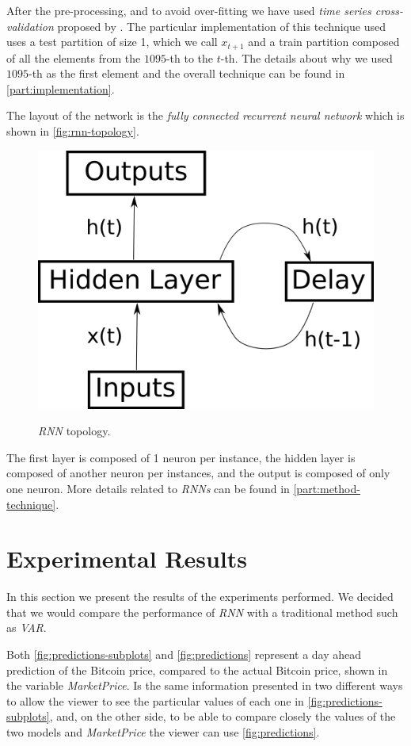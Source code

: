After the pre-processing, and to avoid over-fitting we have used
\textit{time series cross-validation} proposed by
\cite{robjhyndman2010}. The particular implementation of this
technique used uses a test partition of size 1, which we call $x_{t +
1}$ and a train partition composed of all the elements from the
$1095$-th to the $t$-th. The details about why we used $1095$-th as
the first element and the overall technique can be found in
\autoref{part:implementation}.

The layout of the network is the \textit{fully connected recurrent
neural network} which is shown in \autoref{fig:rnn-topology}.

\begin{figure}[bth] \myfloatalign
{\includegraphics[width=.5\linewidth] {gfx/rnn-topology}}
  \caption{\textit{RNN} topology.}
  \label{fig:rnn-topology}
\end{figure}

The first layer is composed of 1 neuron per instance, the hidden layer
is composed of another neuron per instances, and the output is
composed of only one neuron. More details related to \textit{RNNs} can
be found in \autoref{part:method-technique}.

\chapter{Experimental Results}
\label{ch:experimental-results}

In this section we present the results of the experiments performed.
We decided that we would compare the performance of \textit{RNN} with
a traditional method such as \textit{VAR}.

Both \autoref{fig:predictions-subplots} and \autoref{fig:predictions}
represent a day ahead prediction of the Bitcoin price, compared to the
actual Bitcoin price, shown in the variable \textit{MarketPrice}. Is
the same information presented in two different ways to allow the
viewer to see the particular values of each one in
\autoref{fig:predictions-subplots}, and, on the other side, to be able
to compare closely the values of the two models and
\textit{MarketPrice} the viewer can use \autoref{fig:predictions}.

